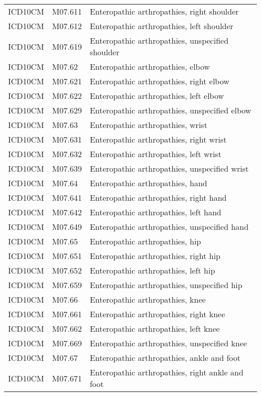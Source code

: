 \begin{table}[ht]
\begin{tabular}{lll}
  ICD10CM & M07.611 & Enteropathic arthropathies, right shoulder \\ 
  ICD10CM & M07.612 & Enteropathic arthropathies, left shoulder \\ 
  ICD10CM & M07.619 & Enteropathic arthropathies, unspecified shoulder \\ 
  ICD10CM & M07.62 & Enteropathic arthropathies, elbow \\ 
  ICD10CM & M07.621 & Enteropathic arthropathies, right elbow \\ 
  ICD10CM & M07.622 & Enteropathic arthropathies, left elbow \\ 
  ICD10CM & M07.629 & Enteropathic arthropathies, unspecified elbow \\ 
  ICD10CM & M07.63 & Enteropathic arthropathies, wrist \\ 
  ICD10CM & M07.631 & Enteropathic arthropathies, right wrist \\ 
  ICD10CM & M07.632 & Enteropathic arthropathies, left wrist \\ 
  ICD10CM & M07.639 & Enteropathic arthropathies, unspecified wrist \\ 
  ICD10CM & M07.64 & Enteropathic arthropathies, hand \\ 
  ICD10CM & M07.641 & Enteropathic arthropathies, right hand \\ 
  ICD10CM & M07.642 & Enteropathic arthropathies, left hand \\ 
  ICD10CM & M07.649 & Enteropathic arthropathies, unspecified hand \\ 
  ICD10CM & M07.65 & Enteropathic arthropathies, hip \\ 
  ICD10CM & M07.651 & Enteropathic arthropathies, right hip \\ 
  ICD10CM & M07.652 & Enteropathic arthropathies, left hip \\ 
  ICD10CM & M07.659 & Enteropathic arthropathies, unspecified hip \\ 
  ICD10CM & M07.66 & Enteropathic arthropathies, knee \\ 
  ICD10CM & M07.661 & Enteropathic arthropathies, right knee \\ 
  ICD10CM & M07.662 & Enteropathic arthropathies, left knee \\ 
  ICD10CM & M07.669 & Enteropathic arthropathies, unspecified knee \\ 
  ICD10CM & M07.67 & Enteropathic arthropathies, ankle and foot \\ 
  ICD10CM & M07.671 & Enteropathic arthropathies, right ankle and foot \\ 

\end{tabular}
\end{table}
